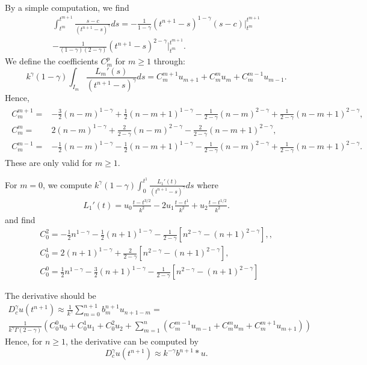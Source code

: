 \documentclass[11pt]{article}
\begin{document}
By a simple computation, we find 
\begin{multline*}
\int_{t^m}^{t^{m+1}}\frac{s-c}{(t^{n+1}-s)^{\gamma}}ds
=-\frac{1}{1-\gamma}(t^{n+1}-s)^{1-\gamma}(s-c)|_{t^m}^{t^{m+1}}\\
-\frac{1}{(1-\gamma)(2-\gamma)}(t^{n+1}-s)^{2-\gamma}|_{t^m}^{t^{m+1}}.
\end{multline*}
We define the coefficients $C_m^p$ for $m\ge 1$ through: $$
k^{\gamma}(1-\gamma)\int_{I_m}\frac{L_m'(s)}{(t^{n+1}-s)^{\gamma}}ds=C_m^{m+1}u_{m+1}+C_m^mu_m+C_{m}^{m-1}u_{m-1}.
$$
Hence,
\begin{gather*}
\begin{array}{cl}
C_m^{m+1}=&-\frac{3}{2}(n-m)^{1-\gamma}+\frac{1}{2}(n-m+1)^{1-\gamma}
-\frac{1}{2-\gamma}(n-m)^{2-\gamma}+\frac{1}{2-\gamma}(n-m+1)^{2-\gamma},\\
C_m^m=&2(n-m)^{1-\gamma}+\frac{2}{2-\gamma}(n-m)^{2-\gamma}
-\frac{2}{2-\gamma}(n-m+1)^{2-\gamma},\\
C_m^{m-1}=&-\frac{1}{2}(n-m)^{1-\gamma}-\frac{1}{2}(n-m+1)^{1-\gamma}
-\frac{1}{2-\gamma}(n-m)^{2-\gamma}+\frac{1}{2-\gamma}(n-m+1)^{2-\gamma}.
\end{array}
\end{gather*}
These are only valid for $m\ge 1$.

For $m=0$, we compute $k^{\gamma}(1-\gamma)\int_0^{t^1}\frac{L_1'(t)}{(t^{n+1}-s)^{\gamma}}ds$ where
\begin{gather*}
L_1'(t)=u_{0}\frac{t-t^{3/2}}{k^2}-2u_1\frac{t-t^1}{k^2}+u_{2}\frac{t-t^{1/2}}{k^2}.
\end{gather*}
and find
\begin{gather*}
C_0^2=-\frac{1}{2}n^{1-\gamma}-\frac{1}{2}(n+1)^{1-\gamma}
-\frac{1}{2-\gamma}[n^{2-\gamma}-(n+1)^{2-\gamma}],, \\
C_0^1=2(n+1)^{1-\gamma}
+\frac{2}{2-\gamma}[n^{2-\gamma}-(n+1)^{2-\gamma}], \\
C_0^0=\frac{1}{2}n^{1-\gamma}-\frac{3}{2}(n+1)^{1-\gamma}
-\frac{1}{2-\gamma}[n^{2-\gamma}-(n+1)^{2-\gamma}]
\end{gather*}

The derivative should be
\begin{multline*}
D_c^{\gamma}u(t^{n+1})\approx \frac{1}{k^{\gamma}}\sum_{m=0}^{n+1}b_{m}^{n+1}u_{n+1-m}=\\
\frac{1}{k^{\gamma}\Gamma(2-\gamma)}(C_0^0u_0+C_0^1u_1+C_0^2u_2+\sum_{m=1}^n(C_m^{m-1}u_{m-1}
+C_m^{m}u_m+C_m^{m+1}u_{m+1}))
\end{multline*}
Hence, for $n\ge 1$, the derivative can be computed by $$
D_c^{\gamma}u(t^{n+1})\approx
k^{-\gamma}b^{n+1}*u.
$$
\end{document}
